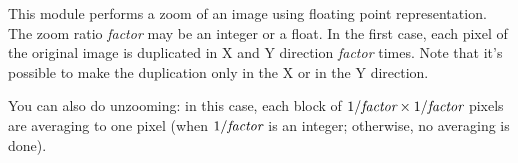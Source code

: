 This module performs a zoom of an image using floating point representation.
The zoom ratio {\em factor} may be an integer or a float.
In the first case, each pixel of the
original image is duplicated in X and Y direction {\em factor} times.
Note that it's possible to make the duplication only in the X or in the Y
direction.

You can also do unzooming: in this case, each block of $1/\mbox{\em factor} \times 1/\mbox{\em factor}$ pixels are averaging to one pixel (when $1/\mbox{\em factor}$ is an integer; otherwise, no averaging is done).
